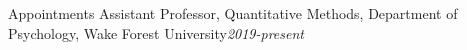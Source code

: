 \begin{rSection}{\textrm{Appointments}}
Assistant Professor, Quantitative Methods, Department of Psychology, Wake Forest University\hfill{\textit{2019-present}}
\end{rSection}